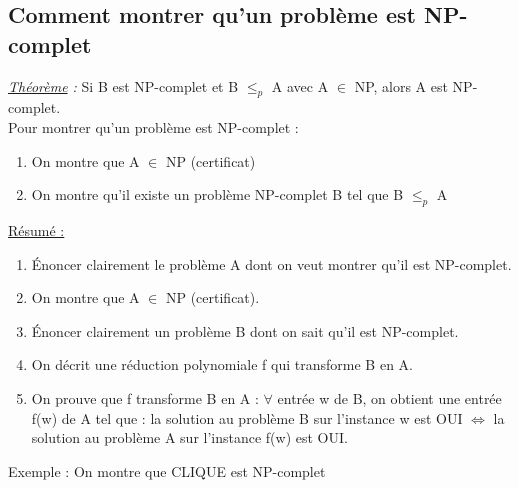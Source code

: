 \documentclass[12pt,a4paper]{article}
\begin{document}
\subsection{Comment montrer qu'un problème est NP-complet}
\textit{\underline{Théorème} :} Si B est NP-complet et B $\leq_p$ A avec A $\in$ NP, alors A est NP-complet.\\
Pour montrer qu'un problème est NP-complet :
\begin{enumerate}
	\item On montre que A $\in$ NP (certificat)
	\item On montre qu'il existe un problème NP-complet B tel que B $\leq_p$ A
\end{enumerate}
\underline{Résumé :}
\begin{enumerate}
	\item Énoncer clairement le problème A dont on veut montrer qu'il est NP-complet.
	\item On montre que A $\in$ NP (certificat).
	\item Énoncer clairement un problème B dont on sait qu'il est NP-complet.
	\item On décrit une réduction polynomiale f qui transforme B en A.
	\item On prouve que f transforme B en A : $\forall$ entrée w de B, on obtient une entrée f(w) de A tel que : la solution au problème B sur l'instance w est OUI $\Leftrightarrow$ la solution au problème A sur l'instance f(w) est OUI.
\end{enumerate}
Exemple : On montre que CLIQUE est NP-complet
\end{document}
